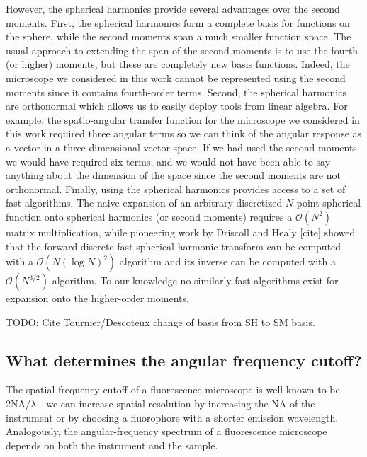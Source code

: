 \documentclass[]{osa-article}
\providecommand{\mc}[1]{\mathcal{#1}}
\begin{document}
However, the spherical harmonics provide several advantages over the second
moments. First, the spherical harmonics form a complete basis for functions on
the sphere, while the second moments span a much smaller function space. The
usual approach to extending the span of the second moments is to use the fourth
(or higher) moments, but these are completely new basis functions. Indeed, the
microscope we considered in this work cannot be represented using the second
moments since it contains fourth-order terms. Second, the spherical harmonics
are orthonormal which allows us to easily deploy tools from linear algebra. For
example, the spatio-angular transfer function for the microscope we considered
in this work required three angular terms so we can think of the angular
response as a vector in a three-dimensional vector space. If we had used the
second moments we would have required six terms, and we would not have been able
to say anything about the dimension of the space since the second moments are
not orthonormal. Finally, using the spherical harmonics provides access to a set
of fast algorithms. The naive expansion of an arbitrary discretized $N$ point
spherical function onto spherical harmonics (or second moments) requires a
$\mc{O}(N^2)$ matrix multiplication, while pioneering work by Driscoll and Healy
[cite] showed that the forward discrete fast spherical harmonic transform can be
computed with a $\mc{O}(N(\log N)^2)$ algorithm and its inverse can be computed
with a $\mc{O}(N^{3/2})$ algorithm. To our knowledge no similarly fast
algorithms exist for expansion onto the higher-order moments.

TODO: Cite Tournier/Descoteux change of basis from SH to SM basis. 

\subsection{What determines the angular frequency cutoff?}
The spatial-frequency cutoff of a fluorescence microscope is well known to be
2NA$/\lambda$---we can increase spatial resolution by increasing the NA of the
instrument or by choosing a fluorophore with a shorter emission wavelength.
Analogously, the angular-frequency spectrum of a fluorescence microscope depends
on both the instrument and the sample.
\end{document}
